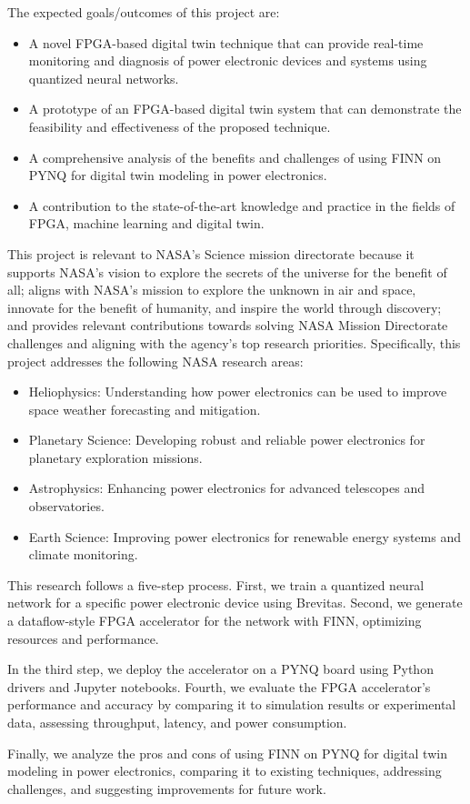 \documentclass[12pt]{article}
\newcommand{\sect}[1]{\noindent{\color{garnet}\textbf{\textsc{#1}}.}}
\begin{document}
\sect{Expected Goals/Outcomes} The expected goals/outcomes of this project are:
\begin{itemize}
    \setlength{\itemsep}{0.2em}
    \item A novel FPGA-based digital twin technique that can provide real-time monitoring and diagnosis of power electronic devices and systems using quantized neural networks.
    \item A prototype of an FPGA-based digital twin system that can demonstrate the feasibility and effectiveness of the proposed technique.
    \item A comprehensive analysis of the benefits and challenges of using FINN on PYNQ for digital twin modeling in power electronics.
    \item A contribution to the state-of-the-art knowledge and practice in the fields of FPGA, machine learning and digital twin.
\end{itemize}

\sect{NASA Relevance} This project is relevant to NASA's Science mission directorate because it supports NASA's vision to explore the secrets of the universe for the benefit of all; aligns with NASA's mission to explore the unknown in air and space, innovate for the benefit of humanity, and inspire the world through discovery; and provides relevant contributions towards solving NASA Mission Directorate challenges and aligning with the agency's top research priorities. Specifically, this project addresses the following NASA research areas:
\begin{itemize}
    \setlength{\itemsep}{0.2em}
    \item Heliophysics: Understanding how power electronics can be used to improve space weather forecasting and mitigation.
    \item Planetary Science: Developing robust and reliable power electronics for planetary exploration missions.
    \item Astrophysics: Enhancing power electronics for advanced telescopes and observatories.
    \item Earth Science: Improving power electronics for renewable energy systems and climate monitoring.
\end{itemize}

\sect{Methods} This research follows a five-step process. First, we train a quantized neural network for a specific power electronic device using Brevitas. Second, we generate a dataflow-style FPGA accelerator for the network with FINN, optimizing resources and performance.

In the third step, we deploy the accelerator on a PYNQ board using Python drivers and Jupyter notebooks. Fourth, we evaluate the FPGA accelerator's performance and accuracy by comparing it to simulation results or experimental data, assessing throughput, latency, and power consumption.

Finally, we analyze the pros and cons of using FINN on PYNQ for digital twin modeling in power electronics, comparing it to existing techniques, addressing challenges, and suggesting improvements for future work.
\end{document}
